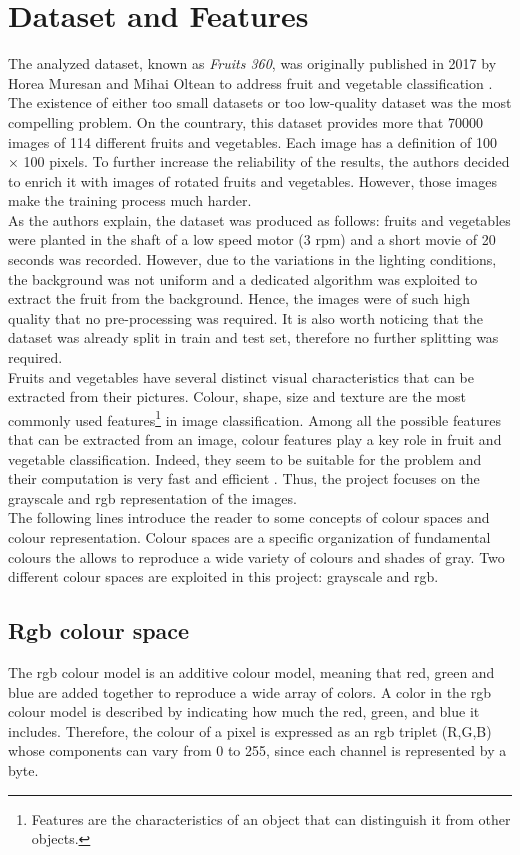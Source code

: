 \documentclass{article}
\begin{document}
\section{Dataset and Features}
The analyzed dataset, known as \textit{Fruits 360}, was originally published in 2017 by Horea Muresan and Mihai Oltean to address fruit and vegetable classification \cite{dataset}. The existence of either too small datasets or too low-quality dataset was the most compelling problem.  On the countrary, this dataset provides more that 70000 images of 114 different fruits and vegetables. Each image has a definition of 100 $\times$ 100 pixels. To further increase the reliability of the results, the authors decided to enrich it with images of rotated fruits and vegetables. However, those images make the training process much harder.\\
As the authors explain, the dataset was produced as follows: fruits and vegetables were planted in the shaft of a low speed motor (3 rpm) and a short movie of 20 seconds was recorded. However, due to the variations in the lighting conditions, the background was not uniform and a dedicated algorithm was exploited to extract the fruit from the background. Hence, the images were of such high quality that no pre-processing was required.
It is also worth noticing that the dataset was already split in train and test set, therefore no further splitting was required.\\
Fruits and vegetables have several distinct visual characteristics that can be extracted from their pictures. Colour, shape, size and texture are the most commonly used features\footnote{Features are the characteristics of an object that can distinguish it from other objects.} in image classification. Among all the possible features that can be extracted from an image, colour features play a key role in fruit and vegetable classification. Indeed, they seem to be suitable for the problem and their computation is very fast and efficient \cite{review}. Thus, the project focuses on the grayscale and rgb representation of the images. \\
The following lines introduce the reader to some concepts of colour spaces and colour representation. Colour spaces are a specific organization of fundamental colours the allows to reproduce a wide variety of colours and shades of gray. Two different colour spaces are exploited in this project: grayscale and rgb.
\subsection{Rgb colour space}
The rgb colour model is an additive colour model, meaning that red, green and blue are added together to reproduce a wide array of colors. A color in the rgb colour model is described by indicating how much the red, green, and blue it includes. Therefore, the colour of a pixel is expressed as an rgb triplet (R,G,B) whose components can vary from 0 to 255, since each channel is represented by a byte.
\end{document}
